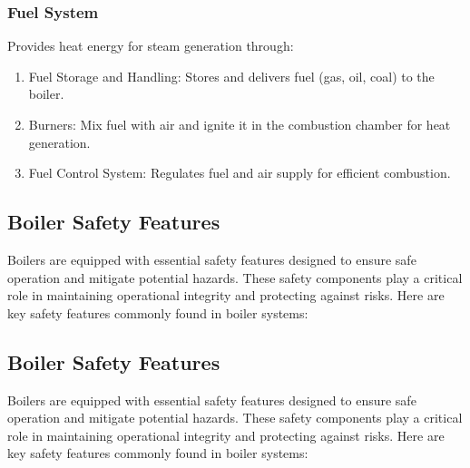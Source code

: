 \subsubsection{Fuel System}
Provides heat energy for steam generation through:
\begin{enumerate}
\item Fuel Storage and Handling: Stores and delivers fuel (gas, oil, coal) to the boiler.
\item Burners: Mix fuel with air and ignite it in the combustion chamber for heat generation.
\item Fuel Control System: Regulates fuel and air supply for efficient combustion.

\end{enumerate}

\subsection{Boiler Safety Features}
Boilers are equipped with essential safety features designed to ensure safe operation and mitigate potential hazards. These safety components play a critical role in maintaining operational integrity and protecting against risks. Here are key safety features commonly found in boiler systems:
\subsection{Boiler Safety Features}
Boilers are equipped with essential safety features designed to ensure safe operation and mitigate potential hazards. These safety components play a critical role in maintaining operational integrity and protecting against risks. Here are key safety features commonly found in boiler systems:

